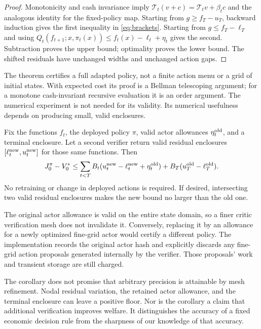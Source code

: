\documentclass[ecta,nameyear,draft]{econsocart}
\begin{document}
\begin{proof}
Monotonicity and cash invariance imply
$\mathcal T_t(v+c)=\mathcal T_tv+\beta_tc$ and the analogous identity for the fixed-policy map. Starting from $g\geq f_T-u_T$, backward induction gives the first inequality in \eqref{eq:brackets}. Starting from $g\leq f_T-\ell_T$ and using
$Q_t(f_{t+1};x,\pi_t(x))\leq f_t(x)-\ell_t+\eta_t$
gives the second. Subtraction proves the upper bound; optimality proves the lower bound. The shifted residuals have unchanged widths and unchanged action gaps.
\end{proof}

The theorem certifies a full adapted policy, not a finite action menu or a grid of initial states. With expected cost its proof is a Bellman telescoping argument; for a monotone cash-invariant recursive evaluation it is an order argument. The numerical experiment is not needed for its validity. Its numerical usefulness depends on producing small, valid enclosures.

\begin{corollary}\label{cor:retain}
Fix the functions $f_t$, the deployed policy $\pi$, valid actor allowances $\eta_t^{\rm old}$, and a terminal enclosure. Let a second verifier return valid residual enclosures $[\ell_t^{\rm new},u_t^{\rm new}]$ for those same functions. Then
\begin{equation}\label{eq:retained}
 J_0^\pi-V_0^*\leq
 \sum_{t<T}B_t(u_t^{\rm new}-\ell_t^{\rm new}+\eta_t^{\rm old})
          +B_T(u_T^{\rm old}-\ell_T^{\rm old}).
\end{equation}
No retraining or change in deployed actions is required. If desired, intersecting two valid residual enclosures makes the new bound no larger than the old one.
\end{corollary}

The original actor allowance is valid on the entire state domain, so a finer critic verification mesh does not invalidate it. Conversely, replacing it by an allowance for a newly optimized fine-grid actor would certify a different policy. The implementation records the original actor hash and explicitly discards any fine-grid action proposals generated internally by the verifier. Those proposals' work and transient storage are still charged.

The corollary does not promise that arbitrary precision is attainable by mesh refinement. Nodal residual variation, the retained actor allowance, and the terminal enclosure can leave a positive floor. Nor is the corollary a claim that additional verification improves welfare. It distinguishes the accuracy of a fixed economic decision rule from the sharpness of our knowledge of that accuracy.
\end{document}

